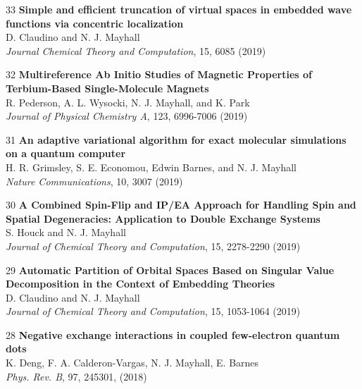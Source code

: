 \documentclass[10pt]{article}
\newenvironment{lonelist}[1][\enskip\textbullet]%
        {\vspace{-\baselineskip}\begin{list}{#1}{%
        \setlength{\partopsep}{0pt}%
        \setlength{\topsep}{0pt}}}
        {\end{list}\vspace{-.6\baselineskip}}
\begin{document}
\begin{lonelist}
\item[33\hspace{4pt}] \textbf{Simple and efficient truncation of virtual spaces in embedded wave functions via concentric localization} \\
D. Claudino and N. J. Mayhall \\
	\textsl{Journal Chemical Theory and Computation}, 15, 6085 (2019)

\item[32\hspace{4pt}] \textbf{Multireference Ab Initio Studies of Magnetic Properties of Terbium-Based Single-Molecule Magnets} \\
	R. Pederson, A. L. Wysocki, N. J. Mayhall, and K. Park\\
\textsl{Journal of Physical Chemistry A},  123, 6996-7006 (2019)

\item[31\hspace{4pt}] \textbf{An adaptive variational algorithm for exact molecular simulations on a quantum computer} \\
	H. R. Grimsley, S. E. Economou, Edwin Barnes,  and N. J. Mayhall\\
\textsl{Nature Communications},  10, 3007 (2019)

\item[30\hspace{4pt}] \textbf{A Combined Spin-Flip and IP/EA Approach for Handling Spin and Spatial Degeneracies: Application to Double Exchange Systems} \\
	S. Houck and N. J. Mayhall\\
\textsl{Journal of Chemical Theory and Computation}, 15, 2278-2290 (2019)

\item[29\hspace{4pt}] \textbf{Automatic Partition of Orbital Spaces Based on Singular Value Decomposition in the Context of Embedding Theories} \\
	D. Claudino and N. J. Mayhall\\
\textsl{Journal of Chemical Theory and Computation}, 15, 1053-1064 (2019)

\item[28\hspace{4pt}] \textbf{Negative exchange interactions in coupled few-electron quantum dots} \\
	K. Deng, F. A. Calderon-Vargas, N. J. Mayhall, E. Barnes\\
\textsl{Phys. Rev. B}, 97, 245301, (2018)


\end{lonelist}
\end{document}
